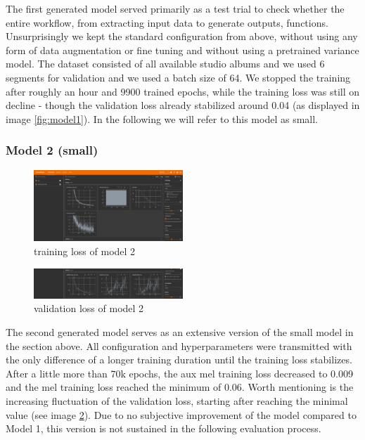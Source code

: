 \documentclass[a4paper]{article}
\begin{document}
	The first generated model served primarily as a test trial to check whether the entire workflow, from extracting input data to generate outputs, functions. Unsurprisingly we kept the standard configuration from above, without using any form of data augmentation or fine tuning and without using a pretrained variance model. The dataset consisted of all available studio albums and we used 6 segments for validation and we used a batch size of 64. We stopped the training after roughly an hour and 9900 trained epochs, while the training loss was still on decline - though the validation loss already stabilized around 0.04 (as displayed in image \ref{fig:model1}). In the following we will refer to this model as small.
	
	\subsubsection{Model 2 (small)}
	
	\begin{figure}[htbp]
		\centering
		\includegraphics[width=0.5\textwidth]{graphics/v2_training.png}
		\caption{training loss of model 2}
		\label{fig:model2train}
	\end{figure}

	\begin{figure}[htbp]
		\centering
		\includegraphics[width=0.5\textwidth]{graphics/v2_testing.png}
		\caption{validation loss of model 2}
		\label{fig:model2val}
	\end{figure}
	
	The second generated model serves as an extensive version of the small model in the section above. All configuration and hyperparameters were transmitted with the only difference of a longer training duration until the training loss stabilizes. After a little more than 70k epochs, the aux mel training loss decreased to 0.009 and the mel training loss reached the minimum of 0.06. Worth mentioning is the increasing fluctuation of the validation loss, starting after reaching the minimal value (see image \ref{fig:model2val}). Due to no subjective improvement of the model compared to Model 1, this version is not sustained in the following evaluation process. 
\end{document}

